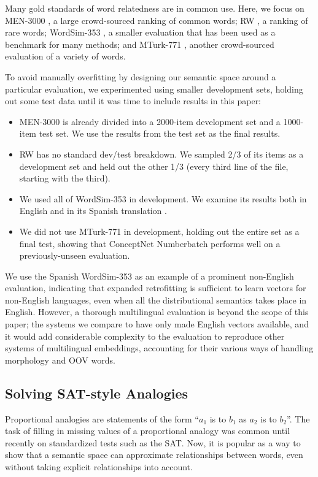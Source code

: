 \documentclass[letterpaper]{article}
\begin{document}
Many gold standards of word relatedness are in common use. Here, we focus on
MEN-3000 \cite{bruni2014men}, a large crowd-sourced ranking of common words; RW
\cite{luong2013rw}, a ranking of rare words; WordSim-353 \cite{finkelstein2001ws},
a smaller evaluation that has been used as a benchmark for many methods; and MTurk-771
\cite{halawi2012mturk}, another crowd-sourced evaluation of a variety of words.

To avoid manually overfitting by designing our semantic space around a
particular evaluation, we experimented using smaller development sets, holding
out some test data until it was time to include results in this paper:

\begin{itemize}
\item
    MEN-3000 is already divided into a 2000-item development set and a
    1000-item test set. We use the results from the test set as the final results.
\item
    RW has no standard dev/test breakdown. We sampled 2/3 of its items as
    a development set and held out the other 1/3 (every third line of the file,
    starting with the third).
\item
    We used all of WordSim-353 in development. We examine its results both in
    English and in its Spanish translation \cite{hassan2009crosslingual}.
\item
    We did not use MTurk-771 in development, holding out the entire set
    as a final test, showing that ConceptNet Numberbatch performs well on a
    previously-unseen evaluation.
\end{itemize}

We use the Spanish WordSim-353 as an example of a prominent non-English evaluation,
indicating that expanded retrofitting is sufficient to learn vectors for
non-English languages, even when all the distributional semantics takes place in
English. However, a thorough multilingual evaluation is beyond the scope of
this paper; the systems we compare to have only made English vectors available,
and it would add considerable complexity to the evaluation to reproduce other
systems of multilingual embeddings, accounting for their various ways of
handling morphology and OOV words.


\subsection{Solving SAT-style Analogies}

Proportional analogies are statements of the form ``$a_1$ is to $b_1$ as $a_2$
is to $b_2$''. The task of filling in missing values of a proportional analogy
was common until recently on standardized tests such as the SAT. Now, it is
popular as a way to show that a semantic space can approximate relationships
between words, even without taking explicit relationships into account.
\end{document}
